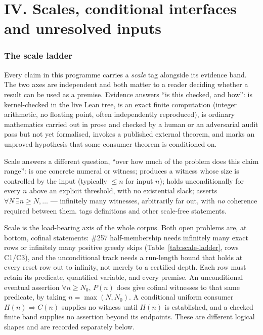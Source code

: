 \clearpage
\part*{IV. Scales, conditional interfaces and unresolved inputs}
\section{The scale ladder}
\label{sec:scale-ladder}

Every claim in this programme carries a \emph{scale} tag alongside its evidence band. The two
axes are independent and both matter to a reader deciding whether a result can be used as a
premise. Evidence answers ``is this checked, and how'':  is kernel-checked in the live
Lean tree,  is an exact finite computation (integer arithmetic, no floating point, often
independently reproduced),  is ordinary mathematics carried out in prose and checked by
a human or an adversarial audit pass but not yet formalised,  invokes a published
external theorem, and  marks an unproved hypothesis that some consumer theorem is
conditioned on.

Scale answers a different question, ``over how much of the problem does this
claim range'':  is one concrete numeral or witness;  produces a
witness whose size is controlled by the input (typically $\le n$ for input $n$); 
holds unconditionally for every $n$ above an explicit threshold, with no existential slack;
 asserts $\forall N\,\exists n\ge N,\ldots$ — infinitely many witnesses, arbitrarily
far out, with \emph{no} coherence required between them.  tags definitions and other
scale-free statements.

Scale is the load-bearing axis of the whole corpus. Both open problems are, at bottom, cofinal
statements: \#257 half-membership needs infinitely many exact rows or infinitely many positive
greedy skips (Table~\ref{tab:scale-ladder}, rows C1/C3), and the unconditional track needs a
run-length bound that holds at every reset row out to infinity, not merely to a certified depth.
Each row must retain its predicate, quantified variable, and every premise. An unconditional
eventual assertion $\forall n\ge N_0,\,P(n)$ does give cofinal witnesses to that same predicate,
by taking $n=\max(N,N_0)$. A conditional uniform consumer $H(n)\Rightarrow C(n)$ supplies no
witness until $H(n)$ is established, and a checked finite band supplies no assertion beyond its
endpoints. These are different logical shapes and are recorded separately below.

